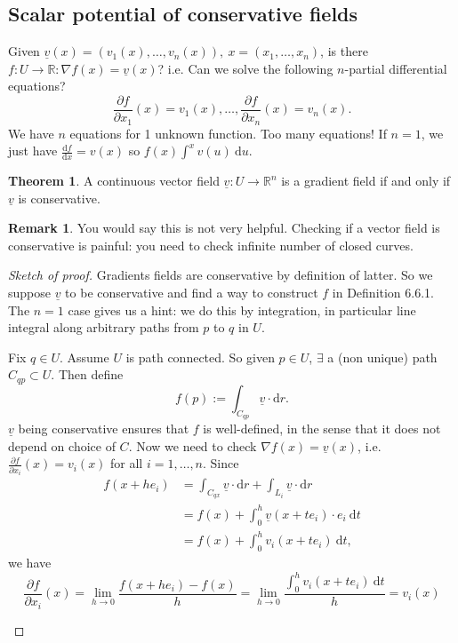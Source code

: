 \documentclass[a4paper]{article}
\theoremstyle{definition}
\newtheorem{thm}[defn]{Theorem}
\newtheorem*{remark}{Remark}
\begin{document}
\subsection{Scalar potential of conservative fields}
Given $\underline v (x) = (v_1(x),\ldots,v_n(x)),\ x=(x_1,\ldots,x_n)$, is there $f:U\rightarrow \mathbb R:\nabla f(x) = \underline v(x)$? i.e. Can we solve the following $n$-partial differential equations?
\[
\frac{\partial f}{\partial x_1}(x)=v_1(x),\ldots,\frac{\partial f}{\partial x_n}(x)=v_n(x) .
\]
We have $n$ equations for 1 unknown function. Too many equations! If $n=1$, we just have $\frac{\mathrm d f}{\mathrm d x} = v(x)$ so $f(x) \int^x v(u) \ \mathrm d u$.
\begin{thm}
A continuous vector field $\underline v:U\rightarrow \mathbb R^n$ is a gradient field if and only if $\underline v$ is conservative.
\end{thm}
\begin{remark}
You would say this is not very helpful. Checking if a vector field is conservative is painful: you need to check infinite number of closed curves.
\end{remark}
\begin{proof}[Sketch of proof]
Gradients fields are conservative by definition of latter. So we suppose $\underline v$ to be conservative and find a way to construct $f$ in Definition 6.6.1. The $n=1$ case gives us a hint: we do this by integration, in particular line integral along arbitrary paths from $p$ to $q$ in $U$.

Fix $q\in U$. Assume $U$ is path connected. So given $p\in U$, $\exists$ a (non unique) path $C_{qp}\subset U$. Then define
\[
f(p):=\int_{C_{qp}} \underline v \cdot \mathrm d r.
\]
$\underline v$ being conservative ensures that $f$ is well-defined, in the sense that it does not depend on choice of $C$. Now we need to check $\nabla f(x) = \underline v (x)$, i.e. $\displaystyle \frac{\partial f}{\partial x_i} (x) = v_i(x)$ for all $i=1,\ldots,n$. Since
\[
\begin{aligned}
f(x+he_i) &=\int_{C_{qx}} \underline v \cdot \mathrm d r + \int_{L_i} \underline v \cdot \mathrm d r  \\&= f(x) + \int_0^h \underline v (x+te_i) \cdot e_i \ \mathrm d t \\&= f(x) + \int_0^h v_i (x+t e_i) \ \mathrm d t ,
\end{aligned}
\]
we have
\[
\frac{\partial f}{\partial x_i} (x) = \lim_{h\rightarrow 0} \frac{f(x+he_i)-f(x)}{h} = \lim_{h\rightarrow 0} \frac{\int_0^h v_i (x+te_i) \ \mathrm d t}{h} = v_i(x)
\]
\begin{center}
\end{center}
\end{proof}
\end{document}
